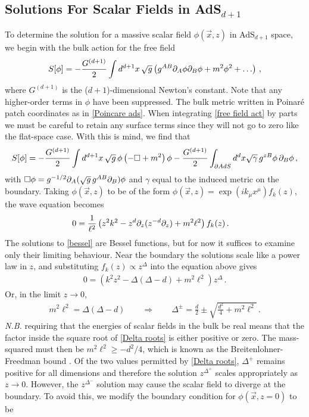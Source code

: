 \documentclass[../PhD.tex]{subfiles}
\begin{document}
\subsection{Solutions For Scalar Fields in AdS$_{d+1}$}
\label{ssec: scalar fields}

To determine the solution for a massive scalar field $\phi(\vec x, z)$ in AdS$_{d+1}$ space, we begin with the bulk action for the free field
\begin{align}
\label{free field act}
S[\phi] = -\frac{G^{(d+1)}}{2} \int d^{d+1} x \, \sqrt{g} \left( g^{AB} \partial_A \phi \partial_B \phi + m^2 \phi^2 + \ldots \right) \, ,
\end{align}
where $G^{(d+1)}$ is the ($d+1$)-dimensional Newton's constant. Note that any higher-order terms in $\phi$ have been suppressed. The bulk metric written in Poinar\'e patch coordinates as in \eqref{Poincare ads}. When integrating \eqref{free field act} by parts we must be careful to retain any surface terms since they will not go to zero like the flat-space case. With this is mind, we find that
\begin{align}
\label{action int by parts}
S[\phi] = -\frac{G^{(d+1)}}{2} \int d^{d+1}x \, \sqrt{g}\, \phi \left( - \Box + m^2 \right) \phi - \frac{G^{(d+1)}}{2}\int_{\partial AdS} d^d x \sqrt{\gamma} \, g^{zB} \phi \, \partial_B \phi \, ,
\end{align}
with $\Box \phi = g^{-1/2} \partial_A (\sqrt{g} \, g^{AB} \partial_B) \phi$ and $\gamma$ equal to the induced metric on the boundary. Taking $\phi(\vec x, z)$ to be of the form $\phi(\vec x, z) = \exp( i k_\mu x^\mu) f_k (z)$, the wave equation becomes
\begin{align}
\label{bessel}
0 &= \frac{1}{\ell^2} \left( z^2 k^2 - z^{d} \partial_z (z^{-d} \partial_z ) + m^2 \ell^2 \right) f_k(z) \, .
\end{align}
The solutions to \eqref{bessel} are Bessel functions, but for now it suffices to examine only their limiting behaviour. Near the boundary the solutions scale like a power law in $z$, and substituting $f_k(z) \propto z^{\Delta}$ into the equation above gives
\begin{align}
0 = \left(k^2 z^2 - \Delta(\Delta - d) + m^2 \ell^2 \right) z^\Delta \, .
\end{align}
Or, in the limit $z \to 0$,
\begin{align}
\label{Delta roots}
m^2 \ell^2 = \Delta (\Delta - d) \qquad \Rightarrow \qquad \Delta^{\pm} = \frac{d}{2} \pm \sqrt{\frac{d^2}{4} + m^2\ell^2} \, .
\end{align}
{\it N.B.} requiring that the energies of scalar fields in the bulk be real means that the factor inside the square root of \eqref{Delta roots} is either positive or zero. The mass-squared must then be $m^2 \ell^2 \geq - d^2 /4$, which is known as the Breitenlohner-Freedman bound \cite{Breitenlohner:1982bm}. Of the two values permitted by \eqref{Delta roots}, $\Delta^+$ remains positive for all dimensions and therefore the solution $z^{\Delta^+}$ scales appropriately as $z \to 0$. However, the $z^{\Delta^-}$ solution may cause the scalar field to diverge at the boundary. To avoid this, we modify the boundary condition for $\phi(\vec x, z=0)$ to be
\end{document}
